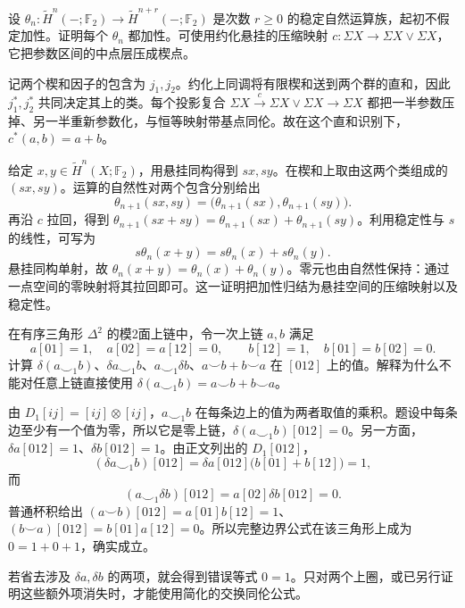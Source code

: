 \begin{exercise}\label{g2:ex:stable-operations-additive}
	设 \(\theta_n:\widetilde H^n(-;\mathbb F_2)\to\widetilde H^{n+r}(-;\mathbb F_2)\) 是次数 \(r\ge0\) 的稳定自然运算族，起初不假定加性。证明每个 \(\theta_n\) 都加性。可使用约化悬挂的压缩映射 \(c:\Sigma X\to\Sigma X\vee\Sigma X\)，它把参数区间的中点层压成楔点。
\end{exercise}
\begin{solution}
	记两个楔和因子的包含为 \(j_1,j_2\)。约化上同调将有限楔和送到两个群的直和，因此 \(j_1^*,j_2^*\) 共同决定其上的类。每个投影复合 \(\Sigma X\xrightarrow{c}\Sigma X\vee\Sigma X\to\Sigma X\) 都把一半参数压掉、另一半重新参数化，与恒等映射带基点同伦。故在这个直和识别下，\(c^*(a,b)=a+b\)。

	给定 \(x,y\in\widetilde H^n(X;\mathbb F_2)\)，用悬挂同构得到 \(sx,sy\)。在楔和上取由这两个类组成的 \((sx,sy)\)。运算的自然性对两个包含分别给出
	\[
		\theta_{n+1}(sx,sy)=\bigl(\theta_{n+1}(sx),\theta_{n+1}(sy)\bigr).
	\]
	再沿 \(c\) 拉回，得到 \(\theta_{n+1}(sx+sy)=\theta_{n+1}(sx)+\theta_{n+1}(sy)\)。利用稳定性与 \(s\) 的线性，可写为
	\[
		s\theta_n(x+y)=s\theta_n(x)+s\theta_n(y).
	\]
	悬挂同构单射，故 \(\theta_n(x+y)=\theta_n(x)+\theta_n(y)\)。零元也由自然性保持：通过一点空间的零映射将其拉回即可。这一证明把加性归结为悬挂空间的压缩映射以及稳定性。
\end{solution}

\begin{exercise}\label{g2:ex:cup-one-nonclosed-cochains}
	在有序三角形 \(\Delta^2\) 的模2面上链中，令一次上链 \(a,b\) 满足
	\[
		a[01]=1,\quad a[02]=a[12]=0,\qquad
		b[12]=1,\quad b[01]=b[02]=0.
	\]
	计算 \(\delta(a\smile_1b)\)、\(\delta a\smile_1b\)、\(a\smile_1\delta b\)、\(a\smile b+b\smile a\) 在 \([012]\) 上的值。解释为什么不能对任意上链直接使用 \(\delta(a\smile_1b)=a\smile b+b\smile a\)。
\end{exercise}
\begin{solution}
	由 \(D_1[ij]=[ij]\otimes[ij]\)，\(a\smile_1b\) 在每条边上的值为两者取值的乘积。题设中每条边至少有一个值为零，所以它是零上链，\(\delta(a\smile_1b)[012]=0\)。另一方面，\(\delta a[012]=1\)、\(\delta b[012]=1\)。由正文列出的 \(D_1[012]\)，
	\[
		(\delta a\smile_1b)[012]=\delta a[012]\bigl(b[01]+b[12]\bigr)=1,
	\]
	而
	\[
		(a\smile_1\delta b)[012]=a[02]\delta b[012]=0.
	\]
	普通杯积给出 \((a\smile b)[012]=a[01]b[12]=1\)、\((b\smile a)[012]=b[01]a[12]=0\)。所以完整边界公式在该三角形上成为 \(0=1+0+1\)，确实成立。

	若省去涉及 \(\delta a,\delta b\) 的两项，就会得到错误等式 \(0=1\)。只对两个上圈，或已另行证明这些额外项消失时，才能使用简化的交换同伦公式。
\end{solution}

